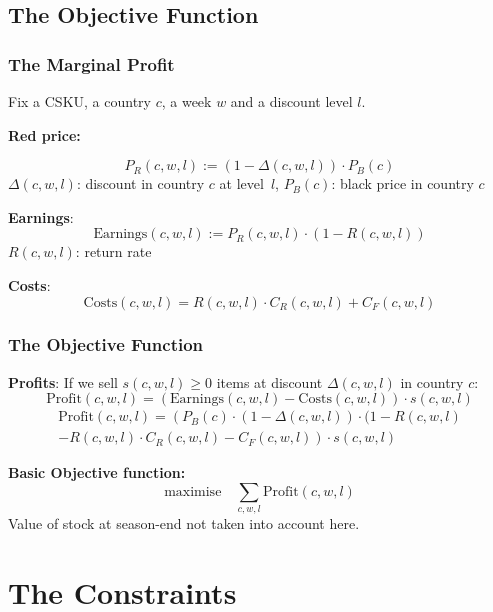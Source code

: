 \documentclass[xcolor=table]{beamer}
\begin{document}
\subsection{The Objective Function}

\begin{frame}[t]
\frametitle{The Marginal Profit}
Fix a CSKU, a country $c$, a week $w$ and a discount level $l$.

\bigskip

\textcolor{orange2}{\textbf{Red price:}}
  
  \[P_R(c, w, l) := (1 - \Delta(c, w, l)) \cdot P_B(c)\]
  $\Delta(c, w, l)$: discount in country $c$ at level~$l$, $P_B(c)$: black price in country $c$

\bigskip

\textcolor{orange2}{\textbf{Earnings}}:
  \[\text{Earnings}(c, w, l) := P_R(c, w, l) \cdot (1 - R(c, w, l))\]
  $R(c, w, l)$: return rate

\bigskip

\textcolor{orange2}{\textbf{Costs}}:
  \[
    \text{Costs}(c, w, l) = R(c, w, l) \cdot C_R(c, w, l) + C_F(c, w, l)
  \]
\end{frame}

\begin{frame}[t]
\frametitle{The Objective Function}
\textcolor{orange2}{\textbf{Profits}}: If we sell $s(c, w, l) \geq 0$ items at 
discount $\Delta(c, w, l)$ in country $c$:
\[
  \text{Profit}(c, w, l) = (\text{Earnings}(c, w, l) - \text{Costs}(c, w, l))
  \cdot s(c, w, l)
\]
\begin{multline*}
  \text{Profit}(c, w, l) =  \left ( P_B(c) \cdot (1 - \Delta(c, w, l)) \cdot (1 - R(c, w, l) \right . \\ 
                    - \left . R(c, w, l) \cdot C_R(c, w, l)  - C_F(c, w, l)
                    \right ) \cdot s(c, w, l)
\end{multline*}

\bigskip

\pause

\textcolor{orange2}{\textbf{Basic Objective function:}} 
\begin{equation*}  
  \text{maximise} \quad \sum_{c, w, l} \text{Profit}(c, w, l)
\end{equation*}
Value of stock at season-end not taken into account here.
\end{frame}

\section{The Constraints}
\end{document}
